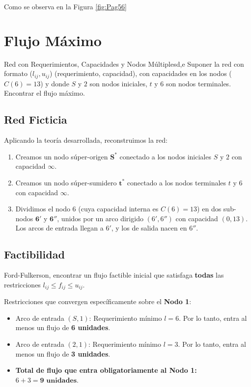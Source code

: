 \documentclass[10pt,a4paper]{article}
\begin{document}
Como se observa en la Figura \autoref{fig:Pag56}

\newpage

\section{Flujo Máximo}

\begin{ejercicio}{Red con Requerimientos, Capacidades y Nodos Múltiples}{d,e}
Suponer la red con formato ($l_{ij}, u_{ij}$) (requerimiento, capacidad), 
con capacidades en los nodos ($C(6)=13$) y donde $S$ y $2$ son nodos iniciales, $t$ y $6$ son nodos terminales. Encontrar el flujo máximo.
\end{ejercicio}

\subsection{ Red Ficticia}

Aplicando la teoría desarrollada, reconstruimos la red:
\begin{enumerate}
    \item Creamos un nodo súper-origen $\mathbf{S^*}$ conectado a los nodos iniciales $S$ y $2$ con capacidad $\infty$.
    \item Creamos un nodo súper-sumidero $\mathbf{t^*}$ conectado a los nodos terminales $t$ y $6$ con capacidad $\infty$.
    \item Dividimos el nodo $6$ (cuya capacidad interna es $C(6)=13$) en dos sub-nodos $\mathbf{6'}$ y $\mathbf{6''}$, unidos por un arco dirigido $(6', 6'')$ con capacidad $(0, 13)$. Los arcos de entrada llegan a $6'$, y los de salida nacen en $6''$.
\end{enumerate}

\subsection{Factibilidad}

Ford-Fulkerson, encontrar un flujo factible inicial que satisfaga 
\textbf{todas} las restricciones $l_{ij} \le f_{ij} \le u_{ij}$. 

Restricciones que convergen específicamente sobre el \textbf{Nodo 1}:
\begin{itemize}
    \item Arco de entrada $(S, 1)$: Requerimiento mínimo $l = 6$. Por lo tanto, entra al menos un flujo de \textbf{6 unidades}.
    \item Arco de entrada $(2, 1)$: Requerimiento mínimo $l = 3$. Por lo tanto, entra al menos un flujo de \textbf{3 unidades}.
    \item \textbf{Total de flujo que entra obligatoriamente al Nodo 1:} $6 + 3 = \mathbf{9 \text{ unidades}}$.
\end{itemize}
\end{document}
